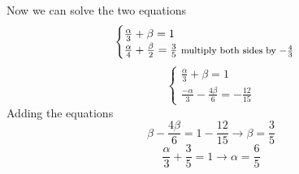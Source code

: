 \documentclass[a4paper, 11pt, oneside]{article}
\begin{document}
\begin{enumerate}
\begin{enumerate}
Now we can solve the two equations
 \begin{equation*}
  \begin{cases}
    \frac{\alpha}{3} + \beta = 1\\
     \frac{\alpha}{4} +  \frac{\beta}{2} = \frac{3}{5}   \text{    \footnotesize multiply both sides by $-\frac{4}{3}$}
  \end{cases} 
  \end{equation*}
   \begin{equation*}
    \begin{cases}
    \frac{\alpha}{3} + \beta = 1\\
     \frac{-\alpha}{3} -  \frac{4\beta}{6} = -\frac{12}{15}
  \end{cases}
\end{equation*}
Adding the equations
\begin{equation*}
\beta -  \frac{4\beta}{6} = 1 - \frac{12}{15} \rightarrow \beta = \frac{3}{5}
\end{equation*}
\begin{equation*}
\frac{\alpha}{3} +  \frac{3}{5} = 1 \rightarrow\alpha = \frac{6}{5}
\end{equation*}


\end{enumerate}
\end{enumerate}
\end{document}

